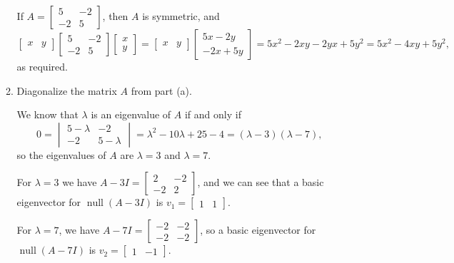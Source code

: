 \documentclass[letterpaper,12pt]{article}
\DeclareMathOperator{\nul}{null}
\begin{document}
\begin{enumerate}
\begin{enumerate}
\bigskip

If $A = \begin{bmatrix}5&-2\\-2&5\end{bmatrix}$, then $A$ is symmetric, and
\[
 \begin{bmatrix}x&y\end{bmatrix}\begin{bmatrix}5&-2\\-2&5\end{bmatrix}\begin{bmatrix}x\\y\end{bmatrix} = \begin{bmatrix}x&y\end{bmatrix}\begin{bmatrix}5x-2y\\-2x+5y\end{bmatrix} = 5x^2-2xy-2yx+5y^2 = 5x^2-4xy+5y^2,
\]
as required.


 \item Diagonalize the matrix $A$ from part (a).

\bigskip

We know that $\lambda$ is an eigenvalue of $A$ if and only if
\[
 0 = \begin{vmatrix}5-\lambda&-2\\-2&5-\lambda\end{vmatrix} = \lambda^2-10\lambda+25-4 = (\lambda-3)(\lambda-7),
\]
so the eigenvalues of $A$ are $\lambda=3$ and $\lambda=7$.

For $\lambda=3$ we have $A-3I = \begin{bmatrix}2&-2\\-2&2\end{bmatrix}$, and we can see that a basic eigenvector for $\nul(A-3I)$ is $v_1 = \begin{bmatrix}1&1\end{bmatrix}$.

For $\lambda = 7$, we have $A-7I = \begin{bmatrix}-2&-2\\-2&-2\end{bmatrix}$, so a basic eigenvector for $\nul(A-7I)$ is $v_2 = \begin{bmatrix}1&-1\end{bmatrix}$.


\end{enumerate}
\end{enumerate}
\end{document}
